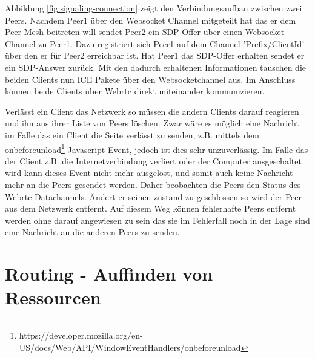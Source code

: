 Abbildung \ref{fig:signaling-connection} zeigt den Verbindungsaufbau zwischen zwei Peers. Nachdem Peer1 über den Websocket Channel mitgeteilt hat das er dem Peer Mesh beitreten will sendet Peer2 ein SDP-Offer über einen Websocket Channel zu Peer1. Dazu registriert sich Peer1 auf dem Channel '{Prefix}/{ClientId}' über den er für Peer2 erreichbar ist. Hat Peer1 das SDP-Offer erhalten sendet er ein SDP-Answer zurück. Mit den dadurch erhaltenen Informationen tauschen die beiden Clients nun ICE Pakete über den Websocketchannel aus. Im Anschluss können beide Clients über Webrtc direkt miteinander kommunizieren. 

Verlässt ein Client das \pTp Netzwerk so müssen die andern Clients darauf reagieren und ihn aus ihrer Liste von Peers löschen. Zwar wäre es möglich eine Nachricht im Falle das ein Client die Seite verlässt zu senden, z.B. mittels dem onbeforeunload\footnote{https://developer.mozilla.org/en-US/docs/Web/API/WindowEventHandlers/onbeforeunload} Javascript Event, jedoch ist dies sehr unzuverlässig. Im Falle das der Client z.B. die Internetverbindung verliert oder der Computer ausgeschaltet wird kann dieses Event nicht mehr ausgelöst, und somit auch keine Nachricht mehr an die Peers gesendet werden. Daher beobachten die Peers den Status des Webrtc Datachannels. Ändert er seinen zustand zu geschlossen so wird der Peer aus dem Netzwerk entfernt. Auf diesem Weg können fehlerhafte Peers entfernt werden ohne darauf angewiesen zu sein das sie im Fehlerfall noch in der Lage sind eine Nachricht an die anderen Peers zu senden.

\section{Routing - Auffinden von Ressourcen}

